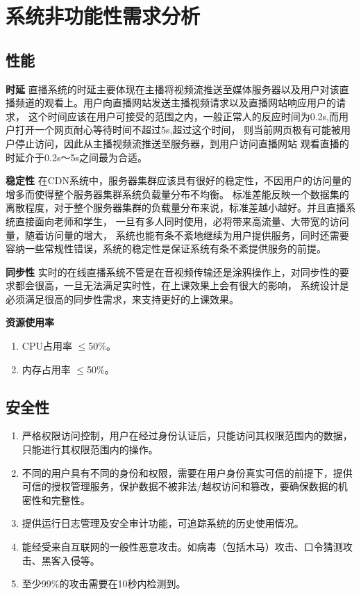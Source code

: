 ﻿\section{系统非功能性需求分析}
\subsection{性能}
\textbf{时延}
直播系统的时延主要体现在主播将视频流推送至媒体服务器以及用户对该直播频道的观看上。用户向直播网站发送主播视频请求以及直播网站响应用户的请求，
这个时间应该在用户可接受的范围之内，一般正常人的反应时间为0.2s,而用户打开一个网页耐心等待时间不超过5s,超过这个时间，
则当前网页极有可能被用户停止访问，因此从主播视频流推送至服务器，到用户访问直播网站 观看直播的时延介于0.2s〜5s之间最为合适。

\textbf{稳定性}
在CDN系统中，服务器集群应该具有很好的稳定性，不因用户的访问量的增多而使得整个服务器集群系统负载量分布不均衡。
标准差能反映一个数据集的离散程度，对于整个服务器集群的负载量分布来说，标准差越小越好。并且直播系统直接面向老师和学生，
一旦有多人同时使用，必将带来高流量、大带宽的访问量，随着访问量的增大，
系统也能有条不紊地继续为用户提供服务，同时还需要容纳一些常规性错误，系统的稳定性是保证系统有条不紊提供服务的前提。

\textbf{同步性}
实时的在线直播系统不管是在音视频传输还是涂鸦操作上，对同步性的要求都会很高，一旦无法满足实时性，在上课效果上会有很大的影响，
系统设计是必须满足很高的同步性需求，来支持更好的上课效果。

\textbf{资源使用率}
\begin{enumerate}
\item CPU占用率 $\leq$50\%。
\item 内存占用率 $\leq$50\%。
\end{enumerate}

\subsection{安全性}
\begin{enumerate}
\item 严格权限访问控制，用户在经过身份认证后，只能访问其权限范围内的数据，只能进行其权限范围内的操作。
\item 不同的用户具有不同的身份和权限，需要在用户身份真实可信的前提下，提供可信的授权管理服务，保护数据不被非法/越权访问和篡改，要确保数据的机密性和完整性。
\item 提供运行日志管理及安全审计功能，可追踪系统的历史使用情况。
\item 能经受来自互联网的一般性恶意攻击。如病毒（包括木马）攻击、口令猜测攻击、黑客入侵等。
\item 至少99\%的攻击需要在10秒内检测到。
\end{enumerate}

